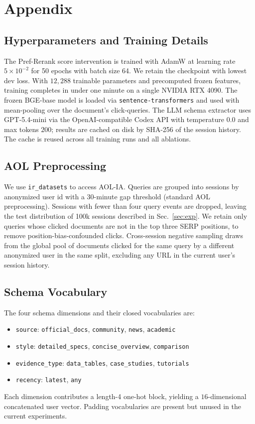 \section{Appendix}

\subsection{Hyperparameters and Training Details}

The Pref-Rerank score intervention is trained with AdamW at learning rate $5 \times 10^{-2}$ for 50 epochs with batch size 64. We retain the checkpoint with lowest dev loss. With $12{,}288$ trainable parameters and precomputed frozen features, training completes in under one minute on a single NVIDIA RTX 4090. The frozen BGE-base model is loaded via \texttt{sentence-transformers} and used with mean-pooling over the document's click-queries. The LLM schema extractor uses GPT-5.4-mini via the OpenAI-compatible Codex API with temperature $0.0$ and max tokens $200$; results are cached on disk by SHA-256 of the session history. The cache is reused across all training runs and all ablations.

\subsection{AOL Preprocessing}

We use \texttt{ir\_datasets} to access AOL-IA. Queries are grouped into sessions by anonymized user id with a 30-minute gap threshold (standard AOL preprocessing). Sessions with fewer than four query events are dropped, leaving the test distribution of 100k sessions described in Sec.~\ref{sec:exp}. We retain only queries whose clicked documents are not in the top three SERP positions, to remove position-bias-confounded clicks. Cross-session negative sampling draws from the global pool of documents clicked for the same query by a different anonymized user in the same split, excluding any URL in the current user's session history.

\subsection{Schema Vocabulary}

The four schema dimensions and their closed vocabularies are:
\begin{itemize}[leftmargin=*,itemsep=1pt]
\item \texttt{source}: \texttt{official\_docs}, \texttt{community}, \texttt{news}, \texttt{academic}
\item \texttt{style}: \texttt{detailed\_specs}, \texttt{concise\_overview}, \texttt{comparison}
\item \texttt{evidence\_type}: \texttt{data\_tables}, \texttt{case\_studies}, \texttt{tutorials}
\item \texttt{recency}: \texttt{latest}, \texttt{any}
\end{itemize}
Each dimension contributes a length-4 one-hot block, yielding a $16$-dimensional concatenated user vector. Padding vocabularies are present but unused in the current experiments.

